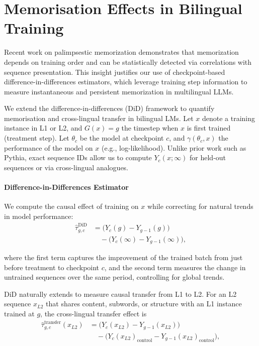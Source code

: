 \section{Memorisation Effects in Bilingual Training}


Recent work on palimpsestic memorization demonstrates that memorization depends on training order and can be statistically detected via correlations with sequence presentation. This insight justifies our use of checkpoint-based difference-in-differences estimators, which leverage training step information to measure instantaneous and persistent memorization in multilingual LLMs.

We extend the difference-in-differences (DiD) framework to quantify memorisation and cross-lingual transfer in bilingual LMs. Let $x$ denote a training instance in L1 or L2, and $G(x) = g$ the timestep when $x$ is first trained (treatment step). Let $\theta_c$ be the model at checkpoint $c$, and $\gamma(\theta_c, x)$ the performance of the model on $x$ (e.g., log-likelihood). Unlike prior work such as Pythia, exact sequence IDs allow us to compute $Y_c(x; \infty)$ for held-out sequences or via cross-lingual analogues.

\paragraph{Difference-in-Differences Estimator} 
We compute the causal effect of training on $x$ while correcting for natural trends in model performance:
\begin{equation}
\begin{aligned}
\hat{\tau}^{\text{DiD}}_{g,c} 
&= \big(Y_c(g) - Y_{g-1}(g)\big) \\
&\quad - \big(Y_c(\infty) - Y_{g-1}(\infty)\big),
\end{aligned}
\end{equation}

where the first term captures the improvement of the trained batch from just before treatment to checkpoint $c$, and the second term measures the change in untrained sequences over the same period, controlling for global trends.

DiD naturally extends to measure causal transfer from L1 to L2. For an L2 sequence $x_{L2}$ that shares content, subwords, or structure with an L1 instance trained at $g$, the cross-lingual transfer effect is
\begin{equation}
\begin{aligned}
\hat{\tau}^{\text{transfer}}_{g,c}(x_{L2}) 
&= \big(Y_c(x_{L2}) - Y_{g-1}(x_{L2})\big) \\
&\quad - \big(Y_c(x_{L2})_{\text{control}} - Y_{g-1}(x_{L2})_{\text{control}}\big),
\end{aligned}
\end{equation}

